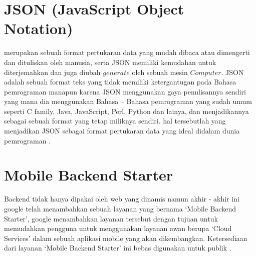 \section{JSON (JavaScript Object Notation)}
	merupakan sebuah format pertukaran data yang mudah dibaca atau dimengerti dan dituliskan oleh manusia, 
serta JSON memiliki kemudahan untuk diterjemahkan dan juga diubah \(generate\) oleh sebuah mesin \(Computer\).
JSON adalah sebuah format teks yang tidak memiliki ketergantugan pada Bahasa pemrograman manapun karena JSON menggunakan 
gaya penulisannya sendiri yang mana dia menggunakan Bahasa – Bahasa pemrograman yang sudah umum seperti C family, Java, 
JavaScript, Perl, Python dan lainya, dan menjadikannya sebagai sebuah format yang tetap miliknya sendiri.
hal tersebutlah yang menjadikan JSON sebagai format pertukaran data yang ideal didalam dunia pemrograman
\cite{crockford2006application}.

\section{Mobile Backend Starter}
	Backend tidak hanya dipakai oleh web yang dinamis namun akhir - akhir ini google telah menambahkan sebuah layanan yang bernama
`Mobile Backend Starter', google menambahkan layanan tersebut dengan tujuan untuk memudahkan pengguna untuk menggunakan
layanan awan berupa `Cloud Services' dalam sebuah aplikasi mobile yang akan dikembangkan. Ketersediaan dari layanan `Mobile Backend Starter' ini bebas digunakan untuk publik
\cite{soinu2014cloud}.



		

